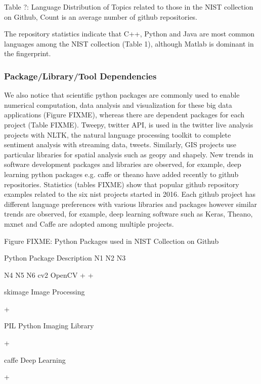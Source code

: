 \documentclass[9pt,twocolumn,twoside]{styles/osajnl}
\begin{document}
	Table ?:  Language Distribution of Topics related to those in the NIST collection on Github, Count is an average number of github repositories.


        The repository statistics indicate that C++, Python and Java
        are most common languages among the NIST collection (Table 1),
        although Matlab is dominant in the fingerprint.


\subsubsection{Package/Library/Tool Dependencies}

We also notice that scientific python packages are commonly used to
enable numerical computation, data analysis and visualization for
these big data applications (Figure FIXME), whereas there are dependent
packages for each project (Table FIXME). Tweepy, twitter API, is used in
the twitter live analysis projects with NLTK, the natural language
processing toolkit to complete sentiment analysis with streaming data,
tweets. Similarly, GIS projects use particular libraries for spatial
analysis such as geopy and shapely. New trends in software development
packages and libraries are observed, for example, deep learning python
packages e.g. caffe or theano have added recently to github
repositories. Statistics (tables FIXME) show that popular github
repository examples related to the six nist projects started in
2016. Each github project has different language preferences with
various libraries and packages however similar trends are observed,
for example, deep learning software such as Keras, Theano, mxnet and
Caffe are adopted among multiple projects.



  

Figure FIXME: Python Packages used in NIST Collection on Github

Python Package
	Description
	N1
	N2
	N3

	N4
	N5
	N6
	cv2
	OpenCV
	+
	+
	 
	 
	 
	 
	skimage
	Image Processing
	 
	+
	 
	 
	 
	 
	PIL
	Python Imaging Library
	 
	+
	 
	 
	 
	 
	caffe
	Deep Learning
	 
	+
	 
\end{document}
